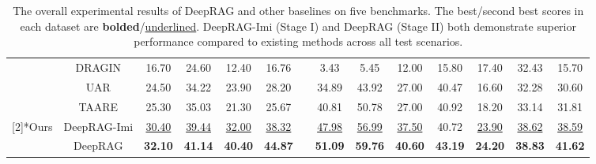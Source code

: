 \begin{table*}[t]
{\begin{tabular}{cccccccccccccc}
          & DRAGIN & 16.70  & 24.60  & 12.40  & 16.76  &       & 3.43  & 5.45  & 12.00  & 15.80  & 17.40  & 32.43  & 15.70  \\
          & UAR   & 24.50  & 34.22  & 23.90  & 28.20  &       & 34.89  & 43.92  & 27.00  & 40.47  & 16.60  & 32.28  & 30.60  \\
          & TAARE & 25.30  & 35.03  & 21.30  & 25.67  &       & 40.81  & 50.78  & 27.00  & 40.92  & 18.20  & 33.14  & 31.81  \\
    \hdashline
    \multirow{2}[2]{*}{Ours} & DeepRAG-Imi & \underline{30.40}  &\underline{ 39.44}  & \underline{32.00}  &\underline{38.32} &       & \underline{47.98}  & \underline{56.99} & \underline{37.50}  & 40.72  & \underline{23.90}  & \underline{38.62}  & \underline{38.59}  \\
          & DeepRAG  & \textbf{32.10}  & \textbf{41.14}  & \textbf{40.40}  & \textbf{44.87}  &       & \textbf{51.09}  & \textbf{59.76}  & \textbf{40.60}  & \textbf{43.19}  & \textbf{24.20}  & \textbf{38.83}  & \textbf{41.62}  \\
    \bottomrule
    \end{tabular}%
    }
    \caption{The overall experimental results of DeepRAG and other baselines on five benchmarks. The best/second best scores in each dataset are
\textbf{bolded}/\underline{underlined}. DeepRAG-Imi (Stage I) and DeepRAG (Stage II) both demonstrate superior performance compared to existing methods across all test scenarios.}
  \label{tab:main-exp}%
\end{table*}%


